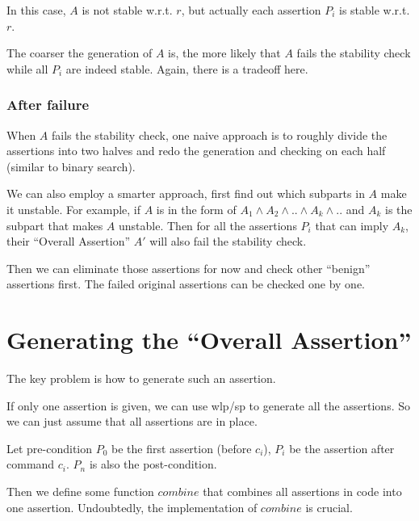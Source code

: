 \documentclass[12pt, fleqn]{article}
\begin{document}
In this case, $A$ is not stable w.r.t. $r$, but actually each assertion
$P_i$ is stable w.r.t. $r$.

The coarser the generation of $A$ is, the more likely that $A$ fails
the stability check while all $P_i$ are indeed stable. Again, there is
a tradeoff here.


\subsubsection{After failure}

When $A$ fails the stability check, one naive approach is to roughly
divide the assertions into two halves and redo the generation and
checking on each half (similar to binary search).

We can also employ a smarter approach, first find out which subparts
in $A$ make it unstable. For example, if $A$ is in the form of $A_1
\land A_2 \land .. \land A_k \land ..$ and $A_k$ is the subpart that
makes $A$ unstable. Then for all the assertions $P_i$ that can imply
$A_k$, their ``Overall Assertion'' $A'$ will also fail the stability
check.

Then we can eliminate those assertions for now and check other
``benign'' assertions first. The failed original assertions can be
checked one by one.


\section{Generating the ``Overall Assertion''}

The key problem is how to generate such an assertion.

\bigskip


If only one assertion is given, we can use wlp/sp to generate all the
assertions. So we can just assume that all assertions are in place.

Let pre-condition $P_0$ be the first assertion (before $c_i$), $P_i$
be the assertion after command $c_i$. $P_n$ is also the
post-condition.

Then we define some function $combine$ that combines all assertions in
code into one assertion. Undoubtedly, the implementation of $combine$
is crucial.
\end{document}
